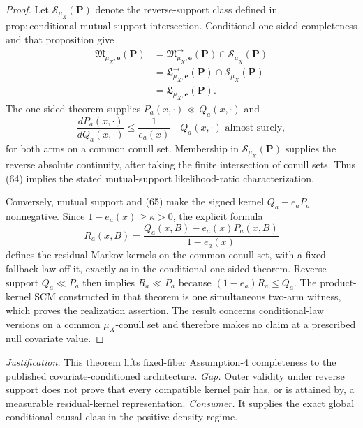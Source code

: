 \documentclass{article}
\begin{document}
\begin{proof}
Let \(\mathcal S_{\mu_X}(\boldsymbol P)\) denote the reverse-support class defined in \(\mathrm{prop:conditional\text{-}mutual\text{-}support\text{-}intersection}\).  Conditional one-sided completeness and that proposition give
\[
 \begin{aligned}
 \mathfrak M_{\mu_X,\boldsymbol e}(\boldsymbol P)
 &=\mathfrak M^{\to}_{\mu_X,\boldsymbol e}(\boldsymbol P)
   \cap\mathcal S_{\mu_X}(\boldsymbol P)\\
 &=\mathfrak L^{\to}_{\mu_X,\boldsymbol e}(\boldsymbol P)
   \cap\mathcal S_{\mu_X}(\boldsymbol P)\\
 &=\mathfrak L_{\mu_X,\boldsymbol e}(\boldsymbol P).
 \end{aligned} \tag{64}
\]
The one-sided theorem supplies \(P_a(x,\cdot)\ll Q_a(x,\cdot)\) and
\[
 \frac{dP_a(x,\cdot)}{dQ_a(x,\cdot)}\le\frac1{e_a(x)}
 \quad Q_a(x,\cdot)\text{-almost surely}, \tag{65}
\]
for both arms on a common conull set.  Membership in \(\mathcal S_{\mu_X}(\boldsymbol P)\) supplies the reverse absolute continuity, after taking the finite intersection of conull sets.  Thus (64) implies the stated mutual-support likelihood-ratio characterization.

Conversely, mutual support and (65) make the signed kernel \(Q_a-e_aP_a\) nonnegative.  Since \(1-e_a(x)\ge\kappa>0\), the explicit formula
\[
 R_a(x,B)=\frac{Q_a(x,B)-e_a(x)P_a(x,B)}{1-e_a(x)}
\]
defines the residual Markov kernels on the common conull set, with a fixed fallback law off it, exactly as in the conditional one-sided theorem.  Reverse support \(Q_a\ll P_a\) then implies \(R_a\ll P_a\) because \((1-e_a)R_a\le Q_a\).  The product-kernel SCM constructed in that theorem is one simultaneous two-arm witness, which proves the realization assertion.  The result concerns conditional-law versions on a common \(\mu_X\)-conull set and therefore makes no claim at a prescribed null covariate value.
\end{proof}
\par\smallskip\noindent \textit{Justification.} This theorem lifts fixed-fiber Assumption-4 completeness to the published covariate-conditioned architecture. \textit{Gap.} Outer validity under reverse support does not prove that every compatible kernel pair has, or is attained by, a measurable residual-kernel representation. \textit{Consumer.} It supplies the exact global conditional causal class in the positive-density regime.
\end{document}
